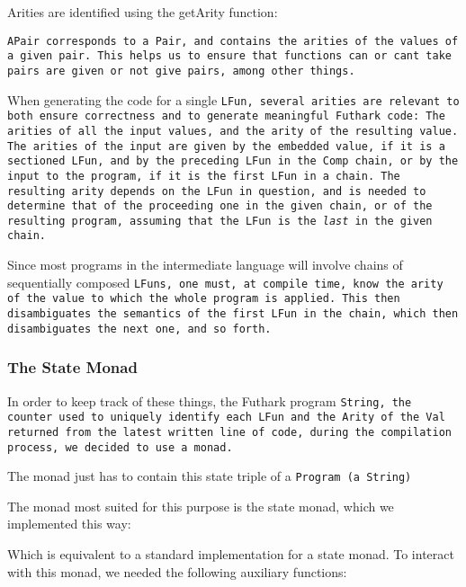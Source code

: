 
Arities are identified using the getArity function:


\tt{APair} corresponds to a \tt{Pair}, and contains the arities of the values
of a given pair.  This helps us to ensure that functions can or cant take
pairs are given or not give pairs, among other things.

When generating the code for a single \tt{LFun}, several arities are relevant to
both ensure correctness and to generate meaningful Futhark code: The
arities of all the input values, and the arity of the resulting value.
The arities of the input are given by the embedded value, if it is a
sectioned \tt{LFun}, and by the preceding \tt{LFun} in the Comp chain, or by the input
to the program, if it is the first \tt{LFun} in a chain.  The resulting arity
depends on the \tt{LFun} in question, and is needed to determine that of the
proceeding one in the given chain, or of the resulting program, assuming that
the \tt{LFun} is the {\it{last}} in the given chain.

Since most programs in the intermediate language will involve chains of
sequentially composed \tt{LFun}s, one must, at compile time, know the arity of the
value to which the whole program is applied.  This then disambiguates the
semantics of the first \tt{LFun} in the chain, which then disambiguates the next
one, and so forth.

\subsubsection{The State Monad}
In order to keep track of these things, the Futhark program \tt{String},
the counter used to uniquely identify each \tt{LFun} and the \tt{Arity} of
the \tt{Val} returned from the latest written line of code, during the
compilation process, we decided to use a monad.

The monad just has to contain this state triple of a \tt{Program} (a
\tt{String})


The monad most suited for this purpose is the state monad, which we
implemented this way:


Which is equivalent to a standard implementation for a state monad.  To
interact with this monad, we needed the following auxiliary functions:

